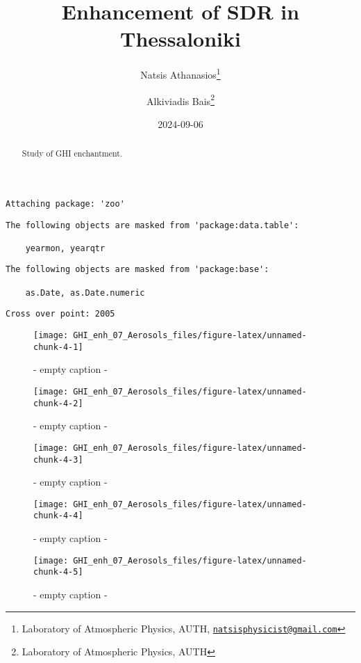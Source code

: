 \documentclass[
  10pt,
  a4paper,oneside]{article}
\title{Enhancement of SDR in Thessaloniki}
\author{Natsis Athanasios\footnote{Laboratory of Atmospheric Physics, AUTH, \href{mailto:natsisphysicist@gmail.com}{\nolinkurl{natsisphysicist@gmail.com}}} \and Alkiviadis Bais\footnote{Laboratory of Atmospheric Physics, AUTH}}
\date{2024-09-06}
\begin{document}
\maketitle
\begin{abstract}
Study of GHI enchantment.
\end{abstract}

{
\hypersetup{linkcolor=}
\setcounter{tocdepth}{4}
\tableofcontents
}
\begin{verbatim}
Attaching package: 'zoo'
\end{verbatim}

\begin{verbatim}
The following objects are masked from 'package:data.table':

    yearmon, yearqtr
\end{verbatim}

\begin{verbatim}
The following objects are masked from 'package:base':

    as.Date, as.Date.numeric
\end{verbatim}

\begin{verbatim}
Cross over point: 2005 
\end{verbatim}

\begin{figure}[H]

{\centering \texttt{[image: GHI\_enh\_07\_Aerosols\_files/figure-latex/unnamed-chunk-4-1]} 

}

\caption{ - empty caption - }\label{fig:unnamed-chunk-4-1}
\end{figure}
\begin{figure}[H]

{\centering \texttt{[image: GHI\_enh\_07\_Aerosols\_files/figure-latex/unnamed-chunk-4-2]} 

}

\caption{ - empty caption - }\label{fig:unnamed-chunk-4-2}
\end{figure}
\begin{figure}[H]

{\centering \texttt{[image: GHI\_enh\_07\_Aerosols\_files/figure-latex/unnamed-chunk-4-3]} 

}

\caption{ - empty caption - }\label{fig:unnamed-chunk-4-3}
\end{figure}
\begin{figure}[H]

{\centering \texttt{[image: GHI\_enh\_07\_Aerosols\_files/figure-latex/unnamed-chunk-4-4]} 

}

\caption{ - empty caption - }\label{fig:unnamed-chunk-4-4}
\end{figure}
\begin{figure}[H]

{\centering \texttt{[image: GHI\_enh\_07\_Aerosols\_files/figure-latex/unnamed-chunk-4-5]} 

}

\caption{ - empty caption - }\label{fig:unnamed-chunk-4-5}
\end{figure}
\end{document}
